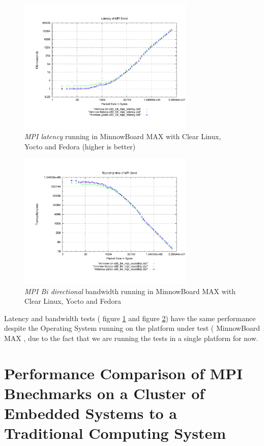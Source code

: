 \begin{figure}[H]
\centering
\includegraphics[width=0.75\textwidth]{images/mpbench_yocto_experiments/mpi_latency.pdf}
\caption{\textit{MPI latency} running in  MinnowBoard MAX  with Clear Linux,
Yocto and Fedora (higher is better)}
\label{mpi_latency_yocto}
\end{figure}


\begin{figure}[H]
\centering
\includegraphics[width=0.75\textwidth]{images/mpbench_yocto_experiments/mpi_roundtrip.pdf}
\caption{\textit{MPI Bi directional} bandwidth running in  MinnowBoard MAX  with Clear Linux,
Yocto and Fedora }
\label{mpi_roundtrip_yocto}
\end{figure}

Latency and bandwidth tests ( figure \ref{mpi_latency_yocto} and figure
\ref{mpi_roundtrip_yocto}) have the same performance despite the Operating
System running on the platform under test (  MinnowBoard MAX  , due to the fact
that we are running the tests in a single platform for now.


\section{Performance Comparison of MPI Bnechmarks on a Cluster of Embedded
Systems to a Traditional Computing System}

